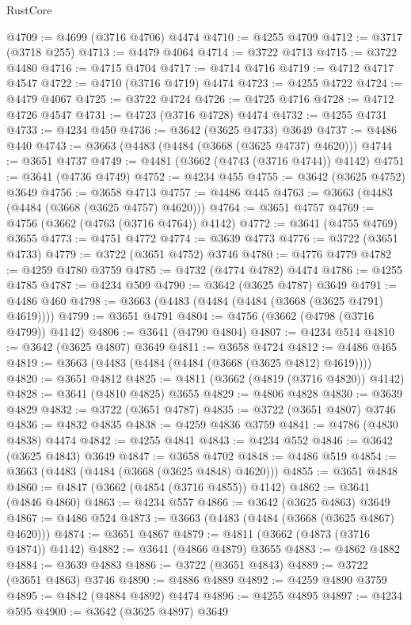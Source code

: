 \begin{lexlean}{RustCore}
\begin{coremodule}
@4709 := @4699 (@3716 @4706) @4474
@4710 := @4255 @4709
@4712 := @3717 (@3718 @255)
@4713 := @4479 @4064
@4714 := @3722 @4713
@4715 := @3722 @4480
@4716 := @4715 @4704
@4717 := @4714 @4716
@4719 := @4712 @4717 @4547
@4722 := @4710 (@3716 @4719) @4474
@4723 := @4255 @4722
@4724 := @4479 @4067
@4725 := @3722 @4724
@4726 := @4725 @4716
@4728 := @4712 @4726 @4547
@4731 := @4723 (@3716 @4728) @4474
@4732 := @4255 @4731
@4733 := @4234 @450
@4736 := @3642 (@3625 @4733) @3649
@4737 := @4486 @440
@4743 := @3663 (@4483 (@4484 (@3668 (@3625 @4737) @4620)))
@4744 := @3651 @4737
@4749 := @4481 (@3662 (@4743 (@3716 @4744)) @4142)
@4751 := @3641 (@4736 @4749)
@4752 := @4234 @455
@4755 := @3642 (@3625 @4752) @3649
@4756 := @3658 @4713
@4757 := @4486 @445
@4763 := @3663 (@4483 (@4484 (@3668 (@3625 @4757) @4620)))
@4764 := @3651 @4757
@4769 := @4756 (@3662 (@4763 (@3716 @4764)) @4142)
@4772 := @3641 (@4755 @4769) @3655
@4773 := @4751 @4772
@4774 := @3639 @4773
@4776 := @3722 (@3651 @4733)
@4779 := @3722 (@3651 @4752) @3746
@4780 := @4776 @4779
@4782 := @4259 @4780 @3759
@4785 := @4732 (@4774 @4782) @4474
@4786 := @4255 @4785
@4787 := @4234 @509
@4790 := @3642 (@3625 @4787) @3649
@4791 := @4486 @460
@4798 := @3663 (@4483 (@4484 (@4484 (@3668 (@3625 @4791) @4619))))
@4799 := @3651 @4791
@4804 := @4756 (@3662 (@4798 (@3716 @4799)) @4142)
@4806 := @3641 (@4790 @4804)
@4807 := @4234 @514
@4810 := @3642 (@3625 @4807) @3649
@4811 := @3658 @4724
@4812 := @4486 @465
@4819 := @3663 (@4483 (@4484 (@4484 (@3668 (@3625 @4812) @4619))))
@4820 := @3651 @4812
@4825 := @4811 (@3662 (@4819 (@3716 @4820)) @4142)
@4828 := @3641 (@4810 @4825) @3655
@4829 := @4806 @4828
@4830 := @3639 @4829
@4832 := @3722 (@3651 @4787)
@4835 := @3722 (@3651 @4807) @3746
@4836 := @4832 @4835
@4838 := @4259 @4836 @3759
@4841 := @4786 (@4830 @4838) @4474
@4842 := @4255 @4841
@4843 := @4234 @552
@4846 := @3642 (@3625 @4843) @3649
@4847 := @3658 @4702
@4848 := @4486 @519
@4854 := @3663 (@4483 (@4484 (@3668 (@3625 @4848) @4620)))
@4855 := @3651 @4848
@4860 := @4847 (@3662 (@4854 (@3716 @4855)) @4142)
@4862 := @3641 (@4846 @4860)
@4863 := @4234 @557
@4866 := @3642 (@3625 @4863) @3649
@4867 := @4486 @524
@4873 := @3663 (@4483 (@4484 (@3668 (@3625 @4867) @4620)))
@4874 := @3651 @4867
@4879 := @4811 (@3662 (@4873 (@3716 @4874)) @4142)
@4882 := @3641 (@4866 @4879) @3655
@4883 := @4862 @4882
@4884 := @3639 @4883
@4886 := @3722 (@3651 @4843)
@4889 := @3722 (@3651 @4863) @3746
@4890 := @4886 @4889
@4892 := @4259 @4890 @3759
@4895 := @4842 (@4884 @4892) @4474
@4896 := @4255 @4895
@4897 := @4234 @595
@4900 := @3642 (@3625 @4897) @3649

\end{coremodule}
\end{lexlean}

